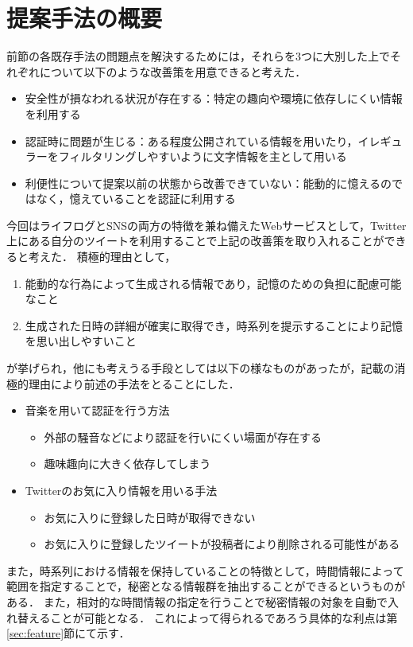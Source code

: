 \section{提案手法の概要}
前節の各既存手法の問題点を解決するためには，それらを3つに大別した上でそれぞれについて以下のような改善策を用意できると考えた．
\begin{itemize}
  \item 安全性が損なわれる状況が存在する：特定の趣向や環境に依存しにくい情報を利用する
  \item 認証時に問題が生じる：ある程度公開されている情報を用いたり，イレギュラーをフィルタリングしやすいように文字情報を主として用いる
  \item 利便性について提案以前の状態から改善できていない：能動的に憶えるのではなく，憶えていることを認証に利用する
\end{itemize}
今回はライフログとSNSの両方の特徴を兼ね備えたWebサービスとして，Twitter上にある自分のツイートを利用することで上記の改善策を取り入れることができると考えた．
積極的理由として，
\begin{enumerate}
\item 能動的な行為によって生成される情報であり，記憶のための負担に配慮可能なこと
\item 生成された日時の詳細が確実に取得でき，時系列を提示することにより記憶を思い出しやすいこと
\end{enumerate}
が挙げられ，他にも考えうる手段としては以下の様なものがあったが，記載の消極的理由により前述の手法をとることにした．
\begin{itemize}
  \item 音楽を用いて認証を行う方法
  \begin{itemize}
    \item 外部の騒音などにより認証を行いにくい場面が存在する
    \item 趣味趣向に大きく依存してしまう
  \end{itemize}
  \item Twitterのお気に入り情報を用いる手法
  \begin{itemize}
    \item お気に入りに登録した日時が取得できない
    \item お気に入りに登録したツイートが投稿者により削除される可能性がある
  \end{itemize}
\end{itemize}

また，時系列における情報を保持していることの特徴として，時間情報によって範囲を指定することで，秘密となる情報群を抽出することができるというものがある．
また，相対的な時間情報の指定を行うことで秘密情報の対象を自動で入れ替えることが可能となる．
これによって得られるであろう具体的な利点は第\ref{sec:feature}節にて示す．


